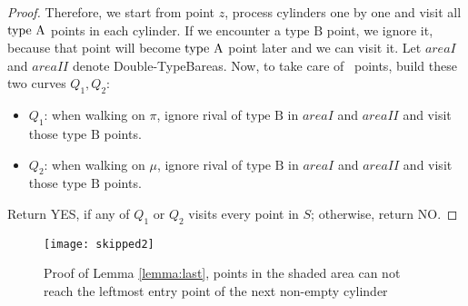 \documentclass[a4paper,UKenglish]{lipics}
\newcommand{\DoubleB}{Double-TypeB}
\newcommand{\pset}{S}
\newcommand{\SemiBad}{\mbox{type B}}
\begin{document}
\begin{proof}
{Therefore, we start from point $z$, process 
cylinders one by one and visit all $\mbox{type A}$ 
points in each cylinder. If we encounter a $\SemiBad$ point, 
we ignore it, because that point will become $\mbox{type A}$ point
later and we can visit it. 
Let $area I$ and $area II$ denote 
\DoubleB areas.
Now, to take care of \TwiceB ~points, 
build these two curves $Q_1, Q_2$:
\begin{itemize}
\item $Q_1$: when walking on $\pi$, ignore rival of $\SemiBad$ in $area I$
and $area II$ and visit those $\SemiBad$ points. 
\item $Q_2$: when walking on $\mu$, ignore rival of $\SemiBad$ in $area I$
and $area II$ and visit those $\SemiBad$ points.
\end{itemize}

Return YES, if any of $Q_1$ or $Q_2$ visits every point in $\pset$;
otherwise, return NO. 
}
\end{proof}






\begin{figure}[t]
\centering
	\texttt{[image: skipped2]}	
	\caption{Proof of Lemma \ref{lemma:last}, points in the 
shaded area can not reach the leftmost entry point of
the next non-empty cylinder }	
	\label{fig:skipped}
\end{figure}
\end{document}
